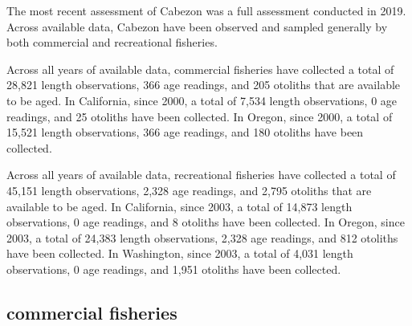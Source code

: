 \documentclass[11pt,
  english,
  letterpaper,
]{article}
\begin{document}
\leavevmode\tagmcend\tagstructend


The most recent assessment of Cabezon was a full assessment conducted in 2019. Across available data, Cabezon have been observed and sampled generally by both commercial and recreational fisheries.

\leavevmode\tagmcend\tagstructend\par


Across all years of available data, commercial fisheries have collected a total of 28,821 length observations, 366 age readings, and 205 otoliths that are available to be aged. In California, since 2000, a total of 7,534 length observations, 0 age readings, and 25 otoliths have been collected. In Oregon, since 2000, a total of 15,521 length observations, 366 age readings, and 180 otoliths have been collected.

\leavevmode\tagmcend\tagstructend\par


Across all years of available data, recreational fisheries have collected a total of 45,151 length observations, 2,328 age readings, and 2,795 otoliths that are available to be aged. In California, since 2003, a total of 14,873 length observations, 0 age readings, and 8 otoliths have been collected. In Oregon, since 2003, a total of 24,383 length observations, 2,328 age readings, and 812 otoliths have been collected. In Washington, since 2003, a total of 4,031 length observations, 0 age readings, and 1,951 otoliths have been collected.

\leavevmode\tagmcend\tagstructend\par


\hypertarget{commercial-fisheries-9}{%
\subsection{commercial fisheries}\label{commercial-fisheries-9}}

\leavevmode\tagmcend\tagstructend


\begingroup\fontsize{10}{12}\selectfont \begingroup\fontsize{10}{12}\selectfont
\end{document}
